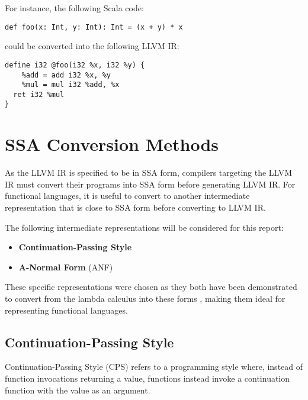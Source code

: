 For instance, the following Scala code:

\begin{verbatim}
def foo(x: Int, y: Int): Int = (x + y) * x
\end{verbatim}

\noindent could be converted into the following LLVM IR:

\begin{verbatim}
define i32 @foo(i32 %x, i32 %y) {
    %add = add i32 %x, %y
    %mul = mul i32 %add, %x
  ret i32 %mul
}
\end{verbatim}

\section{SSA Conversion Methods}

As the LLVM IR is specified to be in SSA form, compilers targeting the LLVM IR must convert their
programs into SSA form before generating LLVM IR. For functional languages, it is useful to convert
to another intermediate representation that is close to SSA form before converting to LLVM IR.

The following intermediate representations will be considered for this report:
\begin{itemize}
    \onehalfspacing
    \item \textbf{Continuation-Passing Style}
    \item \textbf{A-Normal Form} (ANF)
\end{itemize}

These specific representations were chosen as they both have been demonstrated to convert from the
lambda calculus into these forms \autocite{morrisett1999systemf,flanagan1993essence}, making them
ideal for representing functional languages.

\subsection{Continuation-Passing Style}

Continuation-Passing Style (CPS) refers to a programming style where, instead of function
invocations returning a value, functions instead invoke a continuation function with the value as
an argument.


